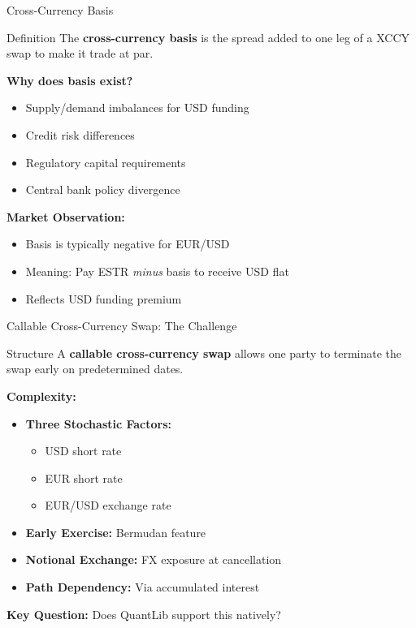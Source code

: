 \documentclass[aspectratio=169,11pt]{beamer}
\begin{document}
\begin{frame}{Cross-Currency Basis}
\begin{block}{Definition}
The \textbf{cross-currency basis} is the spread added to one leg of a XCCY swap to make it trade at par.
\end{block}

\textbf{Why does basis exist?}
\begin{itemize}
    \item Supply/demand imbalances for USD funding
    \item Credit risk differences
    \item Regulatory capital requirements
    \item Central bank policy divergence
\end{itemize}

\textbf{Market Observation:}
\begin{itemize}
    \item Basis is typically negative for EUR/USD
    \item Meaning: Pay ESTR \textit{minus} basis to receive USD flat
    \item Reflects USD funding premium
\end{itemize}
\end{frame}

\begin{frame}{Callable Cross-Currency Swap: The Challenge}
\begin{block}{Structure}
A \textbf{callable cross-currency swap} allows one party to terminate the swap early on predetermined dates.
\end{block}

\textbf{Complexity:}
\begin{itemize}
    \item \textbf{Three Stochastic Factors:}
    \begin{itemize}
        \item USD short rate
        \item EUR short rate
        \item EUR/USD exchange rate
    \end{itemize}
    \item \textbf{Early Exercise:} Bermudan feature
    \item \textbf{Notional Exchange:} FX exposure at cancellation
    \item \textbf{Path Dependency:} Via accumulated interest
\end{itemize}

\textbf{Key Question:} Does QuantLib support this natively?
\end{frame}
\end{document}
